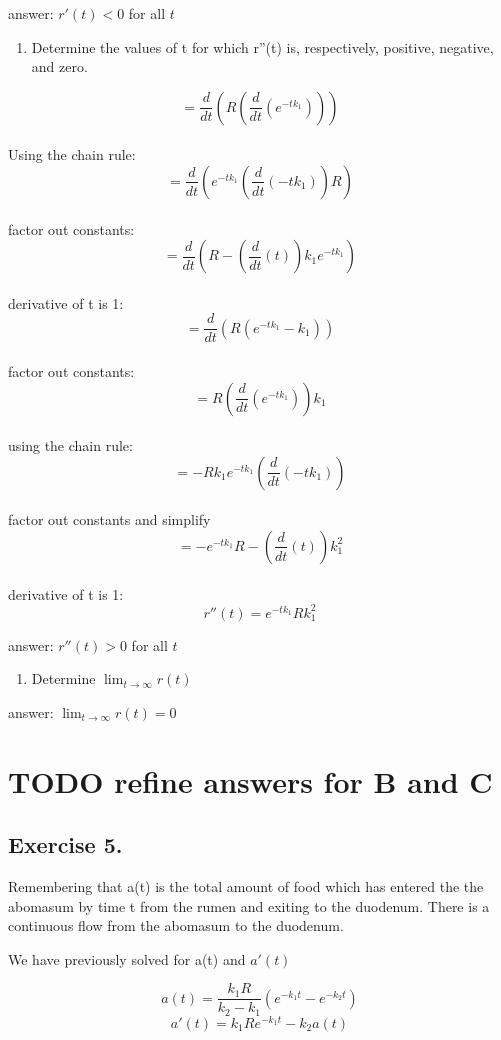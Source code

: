 \documentclass[]{article}
\providecommand{\tightlist}{%
  \setlength{\itemsep}{0pt}\setlength{\parskip}{0pt}}
\begin{document}
answer: \(r'(t) < 0\) for all \(t\)

\begin{enumerate}
\def\labelenumi{(\alph{enumi})}
\setcounter{enumi}{1}
\tightlist
\item
  Determine the values of t for which r''(t) is, respectively, positive,
  negative, and zero.
\end{enumerate}

\[= \frac{d}{dt}(R(\frac{d}{dt}(e^{-tk_1})))\]\\
Using the chain rule:
\[= \frac{d}{dt}(e^{-tk_1}(\frac{d}{dt}(-tk_1))R)\]\\
factor out constants:
\[= \frac{d}{dt}(R -(\frac{d}{dt}(t))k_1 e^{-tk_1})\]\\
derivative of t is 1: \[= \frac{d}{dt}(R(e^{-tk_1}-k_1))\]\\
factor out constants: \[= R(\frac{d}{dt}(e^{-tk_1}))k_1\]\\
using the chain rule: \[= -Rk_1e^{-tk_1}(\frac{d}{dt}(-tk_1))\]\\
factor out constants and simplify
\[= -e^{-tk_1}R-(\frac{d}{dt}(t))k_1^2\]\\
derivative of t is 1: \[r''(t)= e^{-tk_1}Rk_1^2\]

answer: \(r''(t) > 0\) for all \(t\)

\begin{enumerate}
\def\labelenumi{(\alph{enumi})}
\setcounter{enumi}{2}
\tightlist
\item
  Determine \(\lim_{t\to\infty}r(t)\)
\end{enumerate}

answer: \(\lim_{t\to\infty}r(t) =0\)

\section{TODO refine answers for B and
C}\label{todo-refine-answers-for-b-and-c}

\subsection{Exercise 5.}\label{exercise-5.}

Remembering that a(t) is the total amount of food which has entered the
the abomasum by time t from the rumen and exiting to the duodenum. There
is a continuous flow from the abomasum to the duodenum.

We have previously solved for a(t) and \(a'(t)\)

\[a(t) = \frac{k_1 R}{k_2-k_1}(e^{-k_1t} - e^{-k_2t})\]
\[a'(t) = k_1Re^{-k_1t}-k_2a(t)\]
\end{document}

